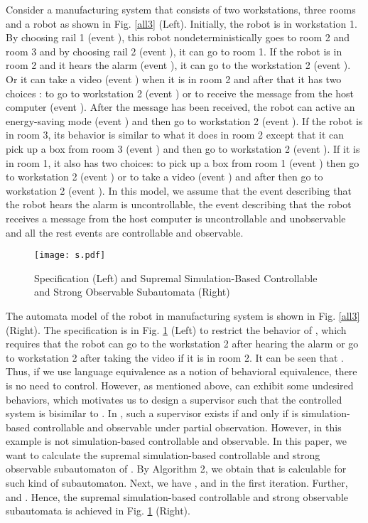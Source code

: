 \documentclass[12pt,draftcls,onecolumn]{IEEEtran}
\begin{document}
Consider a manufacturing system that consists of two workstations,
three rooms and a robot as shown in Fig. \ref{all3} (Left).
Initially, the robot is in workstation 1. By choosing rail 1 (event
), this robot nondeterministically goes to room 2 and room 3 and
by choosing rail 2 (event ), it can go to room 1. If the robot is
in room 2 and it hears the alarm (event ), it can go to the
workstation 2 (event ). Or it can take a video (event ) when
it is in room 2 and after that it has two choices : to go to
workstation 2 (event ) or to receive the message from the host
computer (event ). After the message has been received, the robot
can active an energy-saving mode (event ) and then go to
workstation 2 (event ). If the robot is in room 3, its behavior
is similar to what it does in room 2 except that it can pick up a
box from room 3 (event ) and then go to workstation 2 (event
). If it is in room 1, it also has two choices: to pick up a
box from room 1 (event ) then go to workstation 2 (event )
or to take a video (event ) and after then go to workstation 2
(event ). In this model, we assume that the event 
describing that the robot hears the alarm is uncontrollable, the
event  describing that the robot receives a message from the host
computer is uncontrollable and unobservable and all the rest events
are controllable and observable.



\begin{figure}[!htb]
\begin{center}
\texttt{[image: s.pdf]}
\caption{Specification (Left) and Supremal Simulation-Based
Controllable and Strong Observable Subautomata (Right)} \label{all4}
\end{center}
\end{figure}






The automata model  of the robot in manufacturing system is shown
in Fig. \ref{all3} (Right). The specification  is in Fig.
\ref{all4} (Left) to restrict the behavior of , which requires
that the robot can go to the workstation 2 after hearing the alarm
or go to workstation 2 after taking the video if it is in room 2. It
can be seen that . Thus, if we use language equivalence
as a notion of behavioral equivalence, there is no need to control.
However, as mentioned above,  can exhibit some undesired
behaviors, which motivates us to design a supervisor  such that
the controlled system  is bisimilar to . In \cite{liu}, such
a supervisor  exists if and only if  is simulation-based
controllable and observable under partial observation. However, 
in this example is not simulation-based controllable and observable.
In this paper, we want to calculate the supremal simulation-based
controllable and strong observable subautomaton of . By Algorithm
2, we obtain that  is calculable for such kind of subautomaton.
Next, we have ,  and  in the first iteration.
Further,  and . Hence, the
supremal simulation-based controllable and strong observable
subautomata is achieved in Fig. \ref{all4} (Right).
\end{document}
